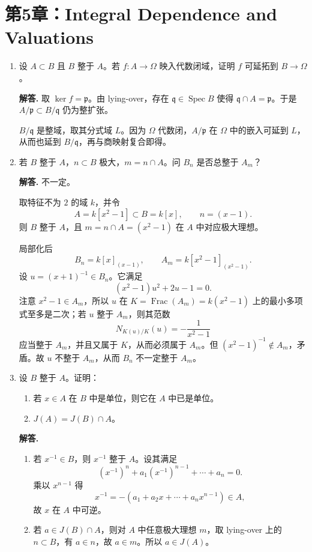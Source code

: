 \documentclass[a4paper]{ctexart}
\begin{document}
\section{第5章：Integral Dependence and Valuations}

\begin{enumerate}[leftmargin=*, label=\textbf{5.\arabic*.}]
\item 设 \(A\subset B\) 且 \(B\) 整于 \(A\)。若 \(f:A\to \Omega\) 映入代数闭域，证明 \(f\) 可延拓到 \(B\to \Omega\)。

\textbf{解答.}
取 \(\ker f=\mathfrak p\)。由 lying-over，存在 \(\mathfrak q\in \operatorname{Spec}B\) 使得 \(\mathfrak q\cap A=\mathfrak p\)。于是 \(A/\mathfrak p\subset B/\mathfrak q\) 仍为整扩张。

\(B/\mathfrak q\) 是整域，取其分式域 \(L\)。因为 \(\Omega\) 代数闭，\(A/\mathfrak p\) 在 \(\Omega\) 中的嵌入可延到 \(L\)，从而也延到 \(B/\mathfrak q\)，再与商映射复合即得。

\setcounter{enumi}{3}
\item 若 \(B\) 整于 \(A\)，\(n\subset B\) 极大，\(m=n\cap A\)。问 \(B_n\) 是否总整于 \(A_m\)？

\textbf{解答.}
不一定。

取特征不为 \(2\) 的域 \(k\)，并令
\[
A=k[x^2-1]\subset B=k[x],\qquad n=(x-1).
\]
则 \(B\) 整于 \(A\)，且 \(m=n\cap A=(x^2-1)\) 在 \(A\) 中对应极大理想。

局部化后
\[
B_n=k[x]_{(x-1)},\qquad A_m=k[x^2-1]_{(x^2-1)}.
\]
设 \(u=(x+1)^{-1}\in B_n\)。它满足
\[
(x^2-1)u^2+2u-1=0.
\]
注意 \(x^2-1\in A_m\)，所以 \(u\) 在 \(K=\operatorname{Frac}(A_m)=k(x^2-1)\) 上的最小多项式至多是二次；若 \(u\) 整于 \(A_m\)，则其范数
\[
N_{K(u)/K}(u)=-\frac{1}{x^2-1}
\]
应当整于 \(A_m\)，并且又属于 \(K\)，从而必须属于 \(A_m\)。但 \((x^2-1)^{-1}\notin A_m\)，矛盾。故 \(u\) 不整于 \(A_m\)，从而 \(B_n\) 不一定整于 \(A_m\)。

\setcounter{enumi}{4}
\item 设 \(B\) 整于 \(A\)。证明：
\begin{enumerate}[label=(\roman*)]
\item 若 \(x\in A\) 在 \(B\) 中是单位，则它在 \(A\) 中已是单位。
\item \(J(A)=J(B)\cap A\)。
\end{enumerate}

\textbf{解答.}
\begin{enumerate}[label=(\roman*)]
\item 若 \(x^{-1}\in B\)，则 \(x^{-1}\) 整于 \(A\)。设其满足
\[
(x^{-1})^n+a_1(x^{-1})^{n-1}+\cdots +a_n=0.
\]
乘以 \(x^{n-1}\) 得
\[
x^{-1}=-(a_1+a_2x+\cdots+a_nx^{n-1})\in A,
\]
故 \(x\) 在 \(A\) 中可逆。
\item 若 \(a\in J(B)\cap A\)，则对 \(A\) 中任意极大理想 \(m\)，取 lying-over 上的 \(n\subset B\)，有 \(a\in n\)，故 \(a\in m\)。所以 \(a\in J(A)\)。


\end{enumerate}
\end{enumerate}
\end{document}
